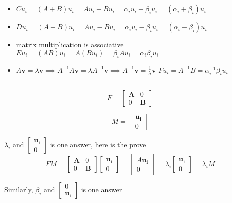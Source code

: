 \documentclass{article}
\begin{document}
\section{}
\subsection{}
\begin{itemize}
    \item
        $Cu_i = (A + B)u_i = Au_i + Bu_i = {\alpha}_iu_i + {\beta}_iu_i =
        ({\alpha}_i + {\beta}_i )u_i$
    \item
        $Du_i = (A - B)u_i = Au_i - Bu_i = {\alpha}_iu_i - {\beta}_iu_i =
        ({\alpha}_i - {\beta}_i )u_i$
    \item
        matrix multiplication is associative\newline
        $Eu_i = (AB)u_i = A(Bu_i) = {\beta}_iAu_i = {\alpha}_i{\beta}_iu_i$
    \item
        $A\mathbf{v} = \lambda\mathbf{v} \implies A^{-1}A\mathbf{v} = \lambda
    A^{-1}\mathbf{v} \implies A^{-1}\mathbf{v} = \frac{1}{\lambda}\mathbf{v}$
    $Fu_i=A^{-1}B={\alpha}_i^{-1}\beta_iu_i$
\end{itemize}
\subsection{}
    \[
        F=
        \begin{bmatrix}
            \mathbf{A} & 0 \\
            0 & \mathbf{B}
        \end{bmatrix}
    \]

    \[
        M=\begin{bmatrix}
            \mathbf{u_i}\\
            0
        \end{bmatrix}
    \]

    ${\lambda}_i$ and
    $
    \begin{bmatrix}
        \mathbf{u_i}\\
        0
    \end{bmatrix}
    $
    is one answer, here is the prove
    \[
        FM=
        \begin{bmatrix}
            \mathbf{A} & 0 \\
            0 & \mathbf{B}
        \end{bmatrix}
        \begin{bmatrix}
            \mathbf{u_i}\\
            0
        \end{bmatrix}
        =
        \begin{bmatrix}
            A\mathbf{u_i}\\
            0
        \end{bmatrix}
        =
        \lambda_i
        \begin{bmatrix}
            \mathbf{u_i}\\
            0
        \end{bmatrix}
        =
        {\lambda_i}
        M
    \]

    Similarly, ${\beta}_i$ and $ \begin{bmatrix}  0 \\ \mathbf{u_i} \end{bmatrix}$ is one
    answer
\end{document}
